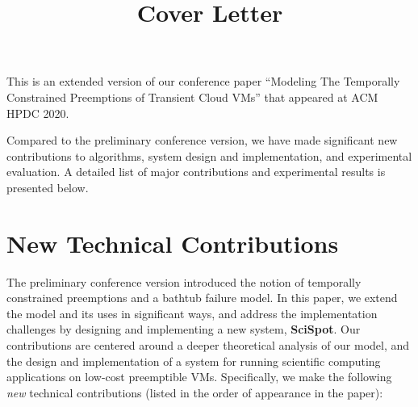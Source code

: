 \documentclass{article}
\title{Cover Letter}
\date{}
\begin{document}
\maketitle

This is an extended version of our conference paper ``Modeling The Temporally Constrained Preemptions of Transient Cloud VMs'' that appeared at ACM HPDC 2020. 

Compared to the preliminary conference version, we have made significant new contributions to algorithms, system design and implementation, and experimental evaluation. A detailed list of major contributions and experimental results is presented below. 



\section{New Technical Contributions}

The preliminary conference version introduced the notion of temporally constrained preemptions and a bathtub failure model.
In this paper, we extend the model and its uses in significant ways, and address the implementation challenges by designing and implementing a new system, \textbf{SciSpot}. 
Our contributions are centered around a deeper theoretical analysis of our model, and the design and implementation of a system for running scientific computing applications on low-cost preemptible VMs. 
Specifically, we make the following \emph{new} technical contributions (listed in the order of appearance in the paper): 
\end{document}
